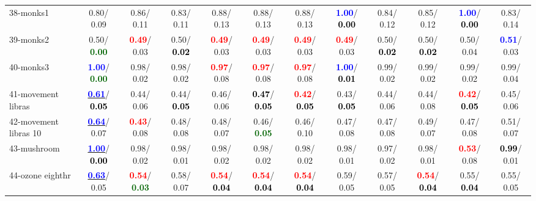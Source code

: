 \begin{table}[h]
\begin{center}
{\begin{tabular}{lc|c|c|c|c|c|c|c|c|c|c}
38-monks1 &   0.80/  0.09 &   0.86/  0.11 &   0.83/  0.11 &   0.88/  0.13 &   0.88/  0.13 &   0.88/  0.13 & \textcolor{blue}{\textbf{  1.00}}/\textcolor{black}{\textbf{  0.00}} &   0.84/  0.12 &   0.85/  0.12 & \textcolor{blue}{\textbf{  1.00}}/\textcolor{black}{\textbf{  0.00}} &   0.83/  0.14 \\
39-monks2 &   0.50/\textcolor{darkgreen}{\textbf{  0.00}} & \textcolor{red}{\textbf{  0.49}}/  0.03 &   0.50/\textcolor{black}{\textbf{  0.02}} & \textcolor{red}{\textbf{  0.49}}/  0.03 & \textcolor{red}{\textbf{  0.49}}/  0.03 & \textcolor{red}{\textbf{  0.49}}/  0.03 & \textcolor{red}{\textbf{  0.49}}/  0.03 &   0.50/\textcolor{black}{\textbf{  0.02}} &   0.50/\textcolor{black}{\textbf{  0.02}} &   0.50/  0.04 & \textcolor{blue}{\textbf{  0.51}}/  0.03 \\ \hline
40-monks3 & \textcolor{blue}{\textbf{  1.00}}/\textcolor{darkgreen}{\textbf{  0.00}} &   0.98/  0.02 &   0.98/  0.02 & \textcolor{red}{\textbf{  0.97}}/  0.08 & \textcolor{red}{\textbf{  0.97}}/  0.08 & \textcolor{red}{\textbf{  0.97}}/  0.08 & \textcolor{blue}{\textbf{  1.00}}/\textcolor{black}{\textbf{  0.01}} &   0.99/  0.02 &   0.99/  0.02 &   0.99/  0.02 &   0.99/  0.04 \\
41-movement libras & \underline{\textcolor{blue}{\textbf{  0.61}}}/\textcolor{black}{\textbf{  0.05}} &   0.44/  0.06 &   0.44/\textcolor{black}{\textbf{  0.05}} &   0.46/  0.06 & \textcolor{black}{\textbf{  0.47}}/\textcolor{black}{\textbf{  0.05}} & \textcolor{red}{\textbf{  0.42}}/\textcolor{black}{\textbf{  0.05}} &   0.43/\textcolor{black}{\textbf{  0.05}} &   0.44/  0.06 &   0.44/  0.08 & \textcolor{red}{\textbf{  0.42}}/\textcolor{black}{\textbf{  0.05}} &   0.45/  0.06 \\
42-movement libras 10 & \underline{\textcolor{blue}{\textbf{  0.64}}}/  0.07 & \textcolor{red}{\textbf{  0.43}}/  0.08 &   0.48/  0.08 &   0.48/  0.07 &   0.46/\textcolor{darkgreen}{\textbf{  0.05}} &   0.46/  0.10 &   0.47/  0.08 &   0.47/  0.08 &   0.49/  0.07 &   0.47/  0.08 &   0.51/  0.07 \\
43-mushroom & \underline{\textcolor{blue}{\textbf{  1.00}}}/\textcolor{black}{\textbf{  0.00}} &   0.98/  0.02 &   0.98/  0.01 &   0.98/  0.02 &   0.98/  0.02 &   0.98/  0.02 &   0.98/  0.01 &   0.97/  0.02 &   0.98/  0.01 & \textcolor{red}{\textbf{  0.53}}/  0.08 & \textcolor{black}{\textbf{  0.99}}/  0.01 \\
44-ozone eighthr & \underline{\textcolor{blue}{\textbf{  0.63}}}/  0.05 & \textcolor{red}{\textbf{  0.54}}/\textcolor{darkgreen}{\textbf{  0.03}} &   0.58/  0.07 & \textcolor{red}{\textbf{  0.54}}/\textcolor{black}{\textbf{  0.04}} & \textcolor{red}{\textbf{  0.54}}/\textcolor{black}{\textbf{  0.04}} & \textcolor{red}{\textbf{  0.54}}/\textcolor{black}{\textbf{  0.04}} &   0.59/  0.05 &   0.57/  0.05 & \textcolor{red}{\textbf{  0.54}}/\textcolor{black}{\textbf{  0.04}} &   0.55/\textcolor{black}{\textbf{  0.04}} &   0.55/  0.05 \\

\end{tabular}}
\end{center}
\end{table}
